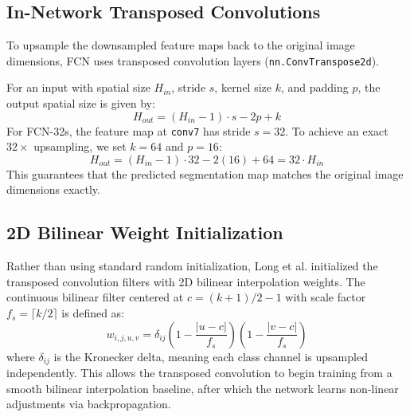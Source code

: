 \documentclass[conference]{IEEEtran}
\begin{document}
\subsection{In-Network Transposed Convolutions}
To upsample the downsampled feature maps back to the original image dimensions, FCN uses transposed convolution layers (\texttt{nn.ConvTranspose2d}).

For an input with spatial size $H_{in}$, stride $s$, kernel size $k$, and padding $p$, the output spatial size is given by:
\begin{equation}
H_{out} = (H_{in} - 1) \cdot s - 2p + k
\end{equation}
For FCN-32s, the feature map at \texttt{conv7} has stride $s = 32$. To achieve an exact $32\times$ upsampling, we set $k = 64$ and $p = 16$:
\begin{equation}
H_{out} = (H_{in} - 1) \cdot 32 - 2(16) + 64 = 32 \cdot H_{in}
\end{equation}
This guarantees that the predicted segmentation map matches the original image dimensions exactly.

\subsection{2D Bilinear Weight Initialization}
Rather than using standard random initialization, Long et al. initialized the transposed convolution filters with 2D bilinear interpolation weights. The continuous bilinear filter centered at $c = (k + 1)/2 - 1$ with scale factor $f_s = \lceil k / 2 \rceil$ is defined as:
\begin{equation}
w_{i, j, u, v} = \delta_{ij} \left(1 - \frac{|u - c|}{f_s}\right) \left(1 - \frac{|v - c|}{f_s}\right)
\end{equation}
where $\delta_{ij}$ is the Kronecker delta, meaning each class channel is upsampled independently. This allows the transposed convolution to begin training from a smooth bilinear interpolation baseline, after which the network learns non-linear adjustments via backpropagation.
\end{document}
